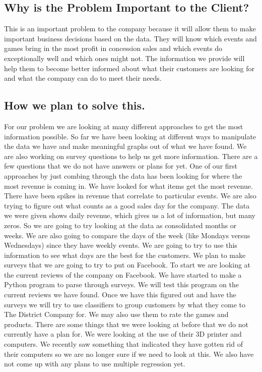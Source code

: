 \documentclass[11pt]{report}
\begin{document}
\subsection*{\hspace{-.5cm} Why is the Problem Important to the
Client?}\label{tech} 
This is an important problem to the company because it will allow them to
make important business decisions based on the data.  They will know which events and games bring in the most profit in concession sales and which events do exceptionally well and which ones might not.  The information we provide will help them to become better informed about what their customers are looking for and what the company can do to meet their needs.



\subsection*{\hspace{-.5cm} How we plan to solve this.}\label{tech}
	For our problem we are looking at many different approaches to get the most information possible.  So far we have been looking at different ways to manipulate the data we have and make meaningful graphs out of what we have found.  We are also working on survey questions to help us get more information.  There are a few questions that we do not have answers or plans for yet.  
\newline
	One of our first approaches by just combing through the data has been looking for where the most revenue is coming in.  We have looked for what items get the most revenue.  There have been spikes in revenue that correlate to particular events.  We are also trying to figure out what counts as a good sales day for the company.  
\newline
	The data we were given shows daily revenue, which gives us a lot of information, but many zeros.  So we are going to try looking at the data as consolidated months or weeks.  We are also going to compare the days of the week (like Mondays versus Wednesdays) since they have weekly events.  We are going to try to use this information to see what days are the best for the customers.  
\newline
	We plan to make surveys that we are going to try to put on Facebook.  To start we are looking at the current reviews of the company on Facebook.  We have started to make a Python program to parse through surveys.  We will test this program on the current reviews we have found.  Once we have this figured out and have the surveys we will try to use classifiers to group customers by what they come to The District Company for.  We may also use them to rate the games and products.  
\newline
	There are some things that we were looking at before that we do not currently have a plan for.  We were looking at the use of their 3D printer and computers.  We recently saw something that indicated they have gotten rid of their computers so we are no longer sure if we need to look at this.  We also have not come up with any plans to use multiple regression yet.  
\end{document}
